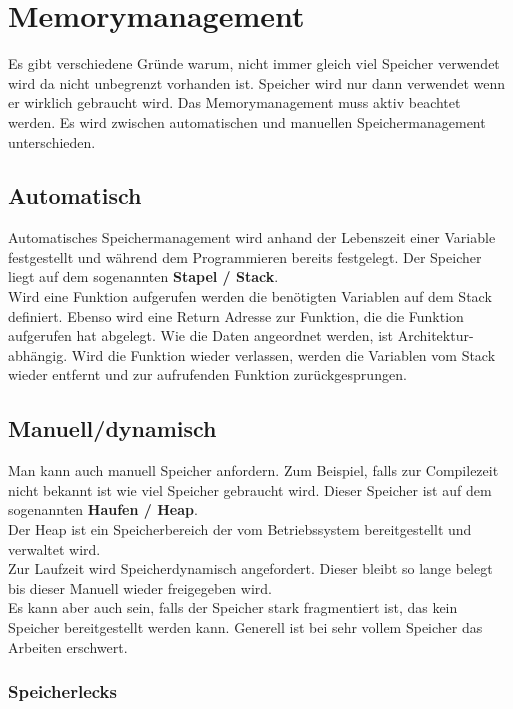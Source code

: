 \section{Memorymanagement}

Es gibt verschiedene Gründe warum, nicht immer gleich viel Speicher verwendet wird da nicht unbegrenzt vorhanden ist.
Speicher wird nur dann verwendet wenn er wirklich gebraucht wird. 
Das Memorymanagement muss aktiv beachtet werden.
Es wird zwischen automatischen und manuellen Speichermanagement unterschieden. 

\subsection{Automatisch}

Automatisches Speichermanagement wird anhand der Lebenszeit einer Variable festgestellt und während dem Programmieren bereits festgelegt. 
Der Speicher liegt auf dem sogenannten \textbf{Stapel / Stack}.\\
Wird eine Funktion aufgerufen werden die benötigten Variablen auf dem Stack definiert. 
Ebenso wird eine Return Adresse zur Funktion, die die Funktion aufgerufen hat abgelegt.
Wie die Daten angeordnet werden, ist Architektur-abhängig.
Wird die Funktion wieder verlassen, werden die Variablen vom Stack wieder entfernt und zur aufrufenden Funktion zurückgesprungen.  

\subsection{Manuell/dynamisch}

Man kann auch manuell Speicher anfordern. 
Zum Beispiel, falls zur Compilezeit nicht bekannt ist wie viel Speicher gebraucht wird.
Dieser Speicher ist auf dem sogenannten \textbf{Haufen / Heap}.\\
Der Heap ist ein Speicherbereich der vom Betriebssystem bereitgestellt und verwaltet wird.\\
Zur Laufzeit wird Speicherdynamisch angefordert. 
Dieser bleibt so lange belegt bis dieser Manuell wieder freigegeben wird.\\
Es kann aber auch sein, falls der Speicher stark fragmentiert ist, das kein Speicher bereitgestellt werden kann. 
Generell ist bei sehr vollem Speicher das Arbeiten erschwert.

\subsubsection{Speicherlecks}

